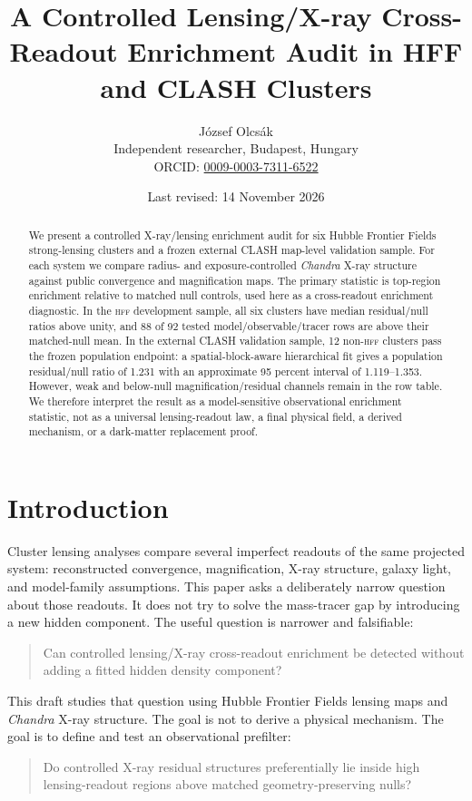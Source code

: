 \documentclass[11pt,a4paper]{article}
\title{A Controlled Lensing/X-ray Cross-Readout Enrichment Audit in HFF and CLASH Clusters}
\author{J\'ozsef Olcs\'ak\\ \small Independent researcher, Budapest, Hungary\\{\small ORCID: \href{https://orcid.org/0009-0003-7311-6522}{0009-0003-7311-6522}}}
\date{Last revised: 14 November 2026}
\newcommand{\HFF}{\textsc{hff}}
\newcommand{\Chandra}{\textit{Chandra}}
\begin{document}
\maketitle

\begin{abstract}
We present a controlled X-ray/lensing enrichment audit for six Hubble Frontier
Fields strong-lensing clusters and a frozen external CLASH map-level
validation sample. For each system we compare radius- and exposure-controlled
\Chandra{} X-ray structure against public convergence and magnification maps.
The primary statistic is top-region enrichment relative to matched null
controls, used here as a cross-readout enrichment diagnostic. In the \HFF{}
development sample, all six clusters have median residual/null ratios above
unity, and 88 of 92 tested model/observable/tracer rows are above their
matched-null mean. In the external CLASH validation sample, 12 non-\HFF{}
clusters pass the frozen population endpoint: a spatial-block-aware
hierarchical fit gives a population residual/null ratio of 1.231 with an
approximate 95 percent interval of 1.119--1.353. However, weak and below-null
magnification/residual channels remain in the row table. We therefore
interpret the result as a model-sensitive observational enrichment statistic,
not as a universal lensing-readout law, a final physical field, a derived
mechanism, or a dark-matter replacement proof.
\end{abstract}

\tableofcontents

\section{Introduction}

Cluster lensing analyses compare several imperfect readouts of the same
projected system: reconstructed convergence, magnification, X-ray structure,
galaxy light, and model-family assumptions. This paper asks a deliberately
narrow question about those readouts. It does not try to solve the mass-tracer
gap by introducing a new hidden component. The useful question is narrower and
falsifiable:
\begin{quote}
Can controlled lensing/X-ray cross-readout enrichment be detected without
adding a fitted hidden density component?
\end{quote}

This draft studies that question using Hubble Frontier Fields lensing maps and
\Chandra{} X-ray structure. The goal is not to derive a physical mechanism.
The goal is to define and test an observational prefilter:
\begin{quote}
Do controlled X-ray residual structures preferentially lie inside high
lensing-readout regions above matched geometry-preserving nulls?
\end{quote}
\end{document}
